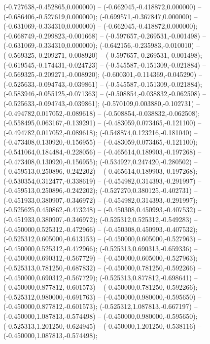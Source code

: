  (-0.727638,-0.452865,0.000000) -- (-0.662045,-0.418872,0.000000) -- (-0.686406,-0.527619,0.000000);
 (-0.699571,-0.367847,0.000000) -- (-0.631069,-0.334310,0.000000) -- (-0.662045,-0.418872,0.000000);
 (-0.668749,-0.299823,-0.001668) -- (-0.597657,-0.269531,-0.001498) -- (-0.631069,-0.334310,0.000000);
 (-0.642156,-0.235983,-0.010010) -- (-0.569325,-0.209271,-0.008920) -- (-0.597657,-0.269531,-0.001498);
 (-0.619545,-0.174431,-0.024723) -- (-0.545587,-0.151309,-0.021884) -- (-0.569325,-0.209271,-0.008920);
 (-0.600301,-0.114369,-0.045290) -- (-0.525633,-0.094743,-0.039861) -- (-0.545587,-0.151309,-0.021884);
 (-0.583946,-0.055125,-0.071363) -- (-0.508854,-0.038832,-0.062508) -- (-0.525633,-0.094743,-0.039861);
 (-0.570109,0.003880,-0.102731) -- (-0.494782,0.017052,-0.089618) -- (-0.508854,-0.038832,-0.062508);
 (-0.558495,0.063167,-0.139291) -- (-0.483059,0.073465,-0.121100) -- (-0.494782,0.017052,-0.089618);
 (-0.548874,0.123216,-0.181040) -- (-0.473408,0.130920,-0.156955) -- (-0.483059,0.073465,-0.121100);
 (-0.541064,0.184484,-0.228056) -- (-0.465614,0.189903,-0.197268) -- (-0.473408,0.130920,-0.156955);
 (-0.534927,0.247420,-0.280502) -- (-0.459513,0.250896,-0.242202) -- (-0.465614,0.189903,-0.197268);
 (-0.530354,0.312477,-0.338619) -- (-0.454982,0.314393,-0.291997) -- (-0.459513,0.250896,-0.242202);
 (-0.527270,0.380125,-0.402731) -- (-0.451933,0.380907,-0.346972) -- (-0.454982,0.314393,-0.291997);
 (-0.525625,0.450862,-0.473248) -- (-0.450308,0.450993,-0.407532) -- (-0.451933,0.380907,-0.346972);
 (-0.525312,0.525312,-0.549283) -- (-0.450000,0.525312,-0.472966) -- (-0.450308,0.450993,-0.407532);
 (-0.525312,0.605000,-0.613153) -- (-0.450000,0.605000,-0.527963) -- (-0.450000,0.525312,-0.472966);
 (-0.525313,0.690313,-0.659336) -- (-0.450000,0.690312,-0.567729) -- (-0.450000,0.605000,-0.527963);
 (-0.525313,0.781250,-0.687832) -- (-0.450000,0.781250,-0.592266) -- (-0.450000,0.690312,-0.567729);
 (-0.525313,0.877812,-0.698641) -- (-0.450000,0.877812,-0.601573) -- (-0.450000,0.781250,-0.592266);
 (-0.525312,0.980000,-0.691763) -- (-0.450000,0.980000,-0.595650) -- (-0.450000,0.877812,-0.601573);
 (-0.525312,1.087813,-0.667197) -- (-0.450000,1.087813,-0.574498) -- (-0.450000,0.980000,-0.595650);
 (-0.525313,1.201250,-0.624945) -- (-0.450000,1.201250,-0.538116) -- (-0.450000,1.087813,-0.574498);
